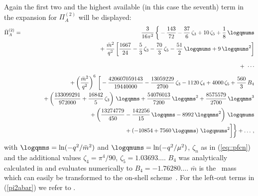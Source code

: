 Again the first two and the highest available (in this case the seventh)
term in the expansion for $\Pi_A^{(2)}$ will be displayed:
\begin{eqnarray}
   \bar{\Pi}^{(2)}_{A} &=& {3 \over 16 \pi^2}\, \bigg\{
%
       - {143\over 72}
          - {37\over 6}\,\zeta_3
          + 10\,\zeta_5
          + {1\over 8}\,\logqmums
%
\nonumber\\&&\mbox{}
       + {\bar{m}^2\over q^2} \, \bigg[
            {1667\over 24}
          - {5\over 3}\,\zeta_3
          - {70\over 3}\,\zeta_5
          - {51\over 2}\,\logqmums
          + 9\,\logqmums^2
          \bigg] 
\nonumber\\[2ex]&&\mbox{}
+ \,\,\cdots
\nonumber\\[1ex]&&\mbox{}
       + \left({\bar{m}^2\over q^2}\right)^{6} \, \bigg[
          - {420607059143\over 19440000}
          - {13059229\over 2700}\,\zeta_3
          - 1120\,\zeta_4
          + 4000\,\zeta_5
          + {560\over 3}\,B_4
\nonumber\\&&\mbox{\hspace{1.0cm}}
          + \left( {133099291\over 972000}
          + {16842\over 5}\,\zeta_3 \right)\,\logqmms
          + {54076013\over 7200}\,\logqmms^2
          + {8575579\over 2700}\,\logqmms^3
\nonumber\\&&\mbox{\hspace{1.0cm}}
          + \left( {13274779\over 450}
          - {142256\over 15}\,\logqmms
          - 8992\,\logqmms^2 \right)\,\logqmums
\nonumber\\&&\mbox{\hspace{1.0cm}}
          + \left( - 10854
          + 7560\,\logqmms \right)\,\logqmums^2
          \bigg]
%
\bigg\} + \ldots\,,
\label{pi2abar}
\end{eqnarray}
with $\logqmms = \ln(-q^2/\bar m^2)$ and $\logqmums = \ln(-q^2/\mu^2)$,
$\zeta_n$ as in (\ref{eq::pfcn}) and the additional values
$\zeta_4 = \pi^4/90$, $\zeta_5 = 1.03693\ldots$.  $B_4$ was
analytically calculated in \cite{Bro92} and evaluates numerically to
$B_4 = -1.76280\ldots$.  $\bar m$ is the \msbar\ mass which can easily be
transformed to the on-shell scheme~\cite{GraBroGraSch90}. For the
left-out terms in (\ref{pi2abar}) we refer to
\cite{CheHarKueSte96,CheHarKueSte97}.

